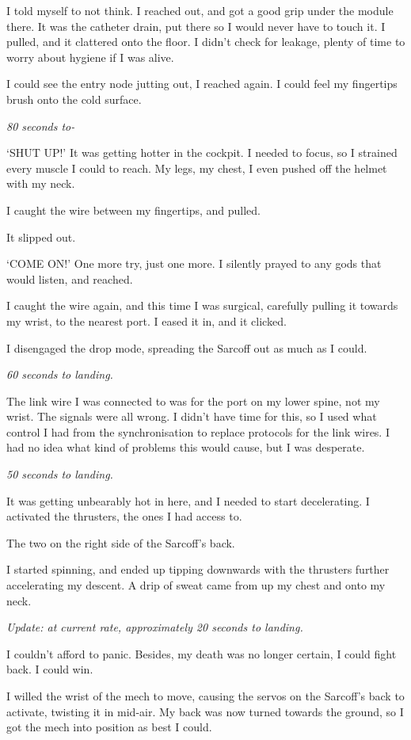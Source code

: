 I told myself to not think. I reached out, and got a good grip under the module there. It was the catheter drain, put there so I would never have to touch it. I pulled, and it clattered onto the floor. I didn't check for leakage, plenty of time to worry about hygiene if I was alive.

I could see the entry node jutting out, I reached again. I could feel my fingertips brush onto the cold surface.

{\it 80 seconds to-}

`SHUT UP!' It was getting hotter in the cockpit. I needed to focus, so I strained every muscle I could to reach. My legs, my chest, I even pushed off the helmet with my neck.

I caught the wire between my fingertips, and pulled.

It slipped out.

`COME ON!' One more try, just one more. I silently prayed to any gods that would listen, and reached.

I caught the wire again, and this time I was surgical, carefully pulling it towards my wrist, to the nearest port. I eased it in, and it clicked.

I disengaged the drop mode, spreading the Sarcoff out as much as I could.

{\it 60 seconds to landing.}

The link wire I was connected to was for the port on my lower spine, not my wrist. The signals were all wrong. I didn't have time for this, so I used what control I had from the synchronisation to replace protocols for the link wires. I had no idea what kind of problems this would cause, but I was desperate.

{\it 50 seconds to landing.}

It was getting unbearably hot in here, and I needed to start decelerating. I activated the thrusters, the ones I had access to.

The two on the right side of the Sarcoff's back.

I started spinning, and ended up tipping downwards with the thrusters further accelerating my descent. A drip of sweat came from up my chest and onto my neck.

{\it Update: at current rate, approximately 20 seconds to landing.}

I couldn't afford to panic. Besides, my death was no longer certain, I could fight back. I could win.

I willed the wrist of the mech to move, causing the servos on the Sarcoff's back to activate, twisting it in mid-air. My back was now turned towards the ground, so I got the mech into position as best I could.

